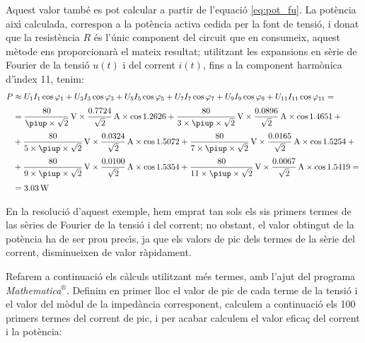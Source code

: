 \begin{exemple}
Aquest valor tamb\'{e} es pot calcular a partir de l'equaci\'{o}
\eqref{eq:pot_fu}. La pot\`{e}ncia aix\'{\i} calculada, correspon a la
pot\`{e}ncia activa cedida per la font de tensi\'{o}, i donat que la
resist\`{e}ncia $R$ \'{e}s l'\'{u}nic component del circuit que en consumeix,
aquest m\`{e}tode ens proporcionar\`{a} el mateix resultat; utilitzant les
expansions en s\`{e}rie de Fourier de la tensi\'{o} $u(t)$ i del corrent
$i(t)$, fins a la component harm\`{o}nica d'\'{\i}ndex 11, tenim:
\[\begin{split}
    P &\approx U_1 I_1 \cos\varphi_1 +  U_3 I_3 \cos\varphi_3 +
     U_5 I_5 \cos\varphi_5 + U_7 I_7 \cos\varphi_7 +
     U_9 I_9 \cos\varphi_9 + U_{11} I_{11} \cos\varphi_{11} = {}\\[0.7ex]
    &= \frac{80}{\piup\times\sqrt{2}}\unit{V} \times
    \frac{\num{0,7724}}{\sqrt{2}}\unit{A} \times \cos \num{1,2626} +
    \frac{80}{3\times\piup\times\sqrt{2}}\unit{V} \times
    \frac{\num{0,0896}}{\sqrt{2}}\unit{A} \times \cos \num{1,4651} + {} \\[0.7ex]
    &+ \frac{80}{5\times\piup\times\sqrt{2}}\unit{V} \times
    \frac{\num{0,0324}}{\sqrt{2}}\unit{A} \times \cos \num{1,5072} +
    \frac{80}{7\times\piup\times\sqrt{2}}\unit{V} \times
    \frac{\num{0,0165}}{\sqrt{2}}\unit{A} \times \cos \num{1,5254} + {}\\[0.7ex]
    &+ \frac{80}{9\times\piup\times\sqrt{2}}\unit{V} \times
    \frac{\num{0,0100}}{\sqrt{2}}\unit{A} \times \cos \num{1,5354} +
    \frac{80}{11\times\piup\times\sqrt{2}}\unit{V} \times
    \frac{\num{0,0067}}{\sqrt{2}}\unit{A} \times \cos \num{1,5419}= {}\\[0.7ex]
    &= \SI{3,03}{W}
\end{split}\]

En la resoluci\'{o} d'aquest exemple, hem emprat tan sols els sis
primers termes de las s\`{e}ries de Fourier de la tensi\'{o} i del corrent;
no obstant, el valor  obtingut de la pot\`{e}ncia ha de ser prou prec\'{\i}s, ja que
els valors de pic dels termes de la s\`{e}rie del corrent, disminueixen de
valor r\`{a}pidament.

Refarem a continuaci\'{o} els c\`{a}lculs utilitzant m\'{e}s termes, amb l'ajut
del programa
\textit{Mathematica}${}^\circledR$.
Definim en primer lloc el valor de pic de cada
 terme de la tensi\'{o} i el valor del m\`{o}dul de la imped\`{a}ncia corresponent,
calculem a continuaci\'{o} els 100 primers termes del corrent de pic, i
per acabar calculem el valor efica\c{c} del corrent i la pot\`{e}ncia:


\end{exemple}

